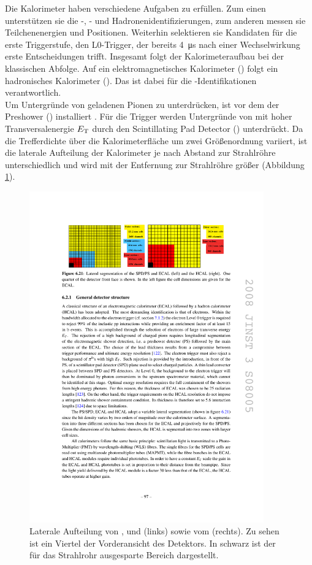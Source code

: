 Die Kalorimeter haben verschiedene Aufgaben zu erfüllen. Zum einen unterstützen sie die \en-, \g- und Hadronenidentifizierungen, zum anderen messen sie Teilchenenergien und Positionen. Weiterhin selektieren sie Kandidaten für die erste Triggerstufe, den L$0$-Trigger, der bereits \SI{4}{\micro s} nach einer Wechselwirkung erste Entscheidungen trifft. Insgesamt folgt der Kalorimeteraufbau bei \lhcb der klassischen Abfolge. Auf ein elektromagnetisches Kalorimeter (\ecal) folgt ein hadronisches Kalorimeter (\hcal). Das \ecal ist dabei für die \en-Identifikationen verantwortlich.\\
Um  Untergründe von geladenen Pionen zu unterdrücken, ist vor dem \ecal der Preshower (\presh) installiert . Für die Trigger werden Untergründe von \piz mit hoher Transversalenergie $\mbox{$E_{\rm T}$}$ durch den Scintillating Pad Detector (\spd) unterdrückt.
Da die Trefferdichte über die Kalorimeterfläche um zwei Größenordnung variiert, ist die laterale Aufteilung der Kalorimeter je nach Abstand zur Strahlröhre unterschiedlich und wird mit der Entfernung zur Strahlröhre größer (Abbildung \ref{fig:kalos}).
\begin{figure}[htpb]
	\centering
		\includegraphics[width=0.9\textwidth]{fig/kalos.pdf}
	\caption{Laterale Aufteilung von \presh, \spd und \ecal (links) sowie vom \hcal (rechts). Zu sehen ist ein Viertel der Vorderansicht des Detektors. In schwarz ist der für das Strahlrohr ausgesparte Bereich dargestellt. \cite{Alves:2008zz}}
	\label{fig:kalos} 
\end{figure}

